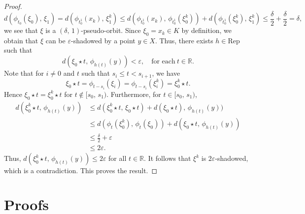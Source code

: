 \documentclass{amsart}
\theoremstyle{definition}
\newcommand{\ep}{\varepsilon}
\begin{document}
\begin{proof}
\[
d(\phi_{t_0}(\xi_0),\,\xi_1) = d(\phi_{t_0^1}(x_k),\,\xi_1^k)\leq
		d(\phi_{t_0^1}(x_k),\,\phi_{t_0^1}(\xi_0^k))+ d(\phi_{t_0^1}(\xi_0^k),\,\xi_1^k)
		\leq \frac{\delta}{2}+\frac{\delta}{2}=\delta,
\]
we see that $\xi$ is a $(\delta,\, 1)$-pseudo-orbit. Since $\xi_0 = x_k\in K$ by definition, we obtain that $\xi$ can be $\ep$-shadowed by a point $y\in X$. Thus, there exists $h\in \mathrm{Rep}$ such that $$d(\xi_0\star t,\,\phi_{h(t)}(y))<\ep,\quad \mbox{for each}\ t\in \mathbb{R}.$$
Note that for $i\neq 0$ and $t$ such that $s_i\leq t < s_{i+1}$, we have $$\xi_0\star t=\phi_{t-s_i}(\xi_i)=\phi_{t-s_i}(\xi_i^k)=\xi^k_0\star t.$$ 
Hence $\xi_0\star t = \xi_0^k\star t$ for $t\not \in [s_0,\, s_{1})$. Furthermore, for $t\in[s_0,\,s_1)$, 
\begin{align*}
d(\xi_0^k\star t,\,\phi_{h(t)}(y))
	&\leq d(\xi_0^k\star t,\,\xi_0\star t) + d(\xi_0\star t),\,\phi_{h(t)}(y)) \\
	&\leq d(\phi_t(\xi_0^k),\,\phi_t(\xi_0)) + d(\xi_0\star t,\,\phi_{h(t)}(y))\\
	&\leq\frac{\delta}{2} + \ep\\
	&\leq 2\ep.
\end{align*}
Thus, $d(\xi_0^k\star t,\,\phi_{h(t)}(y))\leq 2\ep$ for all $t\in \mathbb{R}$. It follows that $\xi^k$ is $2\ep$-shadowed, which is a contradiction. This proves the result.

\end{proof}




\section{Proofs}
\end{document}
